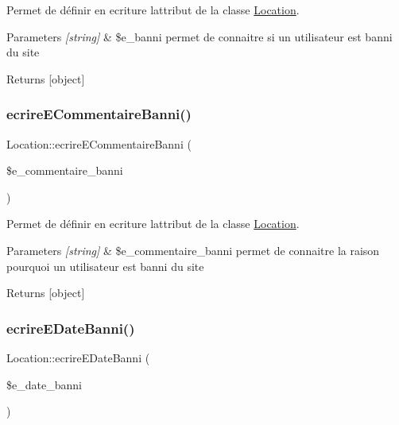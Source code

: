 Permet de définir en ecriture l\textquotesingle{}attribut de la classe \hyperlink{class_location}{Location}. 


\begin{DoxyParams}{Parameters}
{\em \mbox{[}string\mbox{]}} & \$e\+\_\+banni permet de connaitre si un utilisateur est banni du site \\
\hline
\end{DoxyParams}
\begin{DoxyReturn}{Returns}
\mbox{[}object\mbox{]} 
\end{DoxyReturn}
\mbox{\label{class_location_a1513da105184708fa8877db4b3e6cd70}} 
\subsubsection{\texorpdfstring{ecrire\+E\+Commentaire\+Banni()}{ecrireECommentaireBanni()}}
{\footnotesize\ttfamily Location\+::ecrire\+E\+Commentaire\+Banni (\begin{DoxyParamCaption}\item[{}]{\$e\+\_\+commentaire\+\_\+banni }\end{DoxyParamCaption})}



Permet de définir en ecriture l\textquotesingle{}attribut de la classe \hyperlink{class_location}{Location}. 


\begin{DoxyParams}{Parameters}
{\em \mbox{[}string\mbox{]}} & \$e\+\_\+commentaire\+\_\+banni permet de connaitre la raison pourquoi un utilisateur est banni du site \\
\hline
\end{DoxyParams}
\begin{DoxyReturn}{Returns}
\mbox{[}object\mbox{]} 
\end{DoxyReturn}
\mbox{\label{class_location_aa1d4fe362f94b688a3abe9268f4a84ca}} 
\subsubsection{\texorpdfstring{ecrire\+E\+Date\+Banni()}{ecrireEDateBanni()}}
{\footnotesize\ttfamily Location\+::ecrire\+E\+Date\+Banni (\begin{DoxyParamCaption}\item[{}]{\$e\+\_\+date\+\_\+banni }\end{DoxyParamCaption})}



